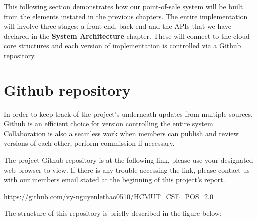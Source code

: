 \documentclass[12pt, a4paper]{article}
\theoremstyle{styleth}
\theoremstyle{styledef}
\begin{document}
This following section demonstrates how our point-of-sale system will be built from the elements instated in the previous chapters. The entire implementation will involve three stages: a front-end, back-end and the APIs that we have declared in the \textbf{System Architecture} chapter. These will connect to the cloud core structures and each version of implementation is controlled via a Github repository.

\setcounter{section}{0}
\section{Github repository}

In order to keep track of the project's underneath updates from multiple sources, Github is an efficient choice for version controlling the entire system. Collaboration is also a seamless work when members can publish and review versions of each other, perform commission if necessary.

\vspace{5mm}
The project Github repository is at the following link, please use your designated web browser to view. If there is any trouble accessing the link, please contact us with our members email stated at the beginning of this project's report.

\vspace{5mm}
\url{https://github.com/vy-nguyenlethao0510/HCMUT\_CSE\_POS\_2.0}

\vspace{5mm}
The structure of this repository is briefly described in the figure below:
\end{document}
